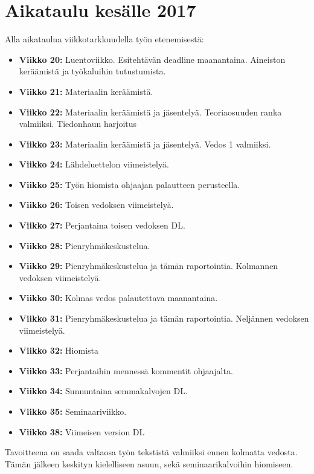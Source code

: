 \documentclass[finnish,12pt,a4paper,elec,utf8]{aaltothesis}
\begin{document}
\section{Aikataulu kesälle 2017}
Alla aikataulua viikkotarkkuudella työn etenemisestä:
\begin{itemize}
    \item \textbf{Viikko 20:} Luentoviikko. Esitehtävän deadline maanantaina. Aineiston keräämistä ja työkaluihin tutustumista.
    \item \textbf{Viikko 21:} Materiaalin keräämistä.
    \item \textbf{Viikko 22:} Materiaalin keräämistä ja jäsentelyä. Teoriaosuuden ranka valmiiksi. Tiedonhaun harjoitus
    \item \textbf{Viikko 23:} Materiaalin keräämistä ja jäsentelyä. Vedos 1 valmiiksi.
    \item \textbf{Viikko 24:} Lähdeluettelon viimeistelyä.
    \item \textbf{Viikko 25:} Työn hiomista ohjaajan palautteen perusteella.
    \item \textbf{Viikko 26:} Toisen vedoksen viimeistelyä.
    \item \textbf{Viikko 27:} Perjantaina toisen vedoksen DL.
    \item \textbf{Viikko 28:} Pienryhmäkeskustelua.
    \item \textbf{Viikko 29:} Pienryhmäkeskustelua ja tämän raportointia. Kolmannen vedoksen viimeistelyä.
    \item \textbf{Viikko 30:} Kolmas vedos palautettava maanantaina.
    \item \textbf{Viikko 31:} Pienryhmäkeskustelua ja tämän raportointia. Neljännen vedoksen viimeistelyä.
    \item \textbf{Viikko 32:} Hiomista
    \item \textbf{Viikko 33:} Perjantaihin mennessä kommentit ohjaajalta.
    \item \textbf{Viikko 34:} Sunnuntaina semmakalvojen DL.
    \item \textbf{Viikko 35:} Seminaariviikko.
    \item \textbf{Viikko 38:} Viimeisen version DL
\end{itemize}
Tavoitteena on saada valtaosa työn tekstistä valmiiksi ennen kolmatta vedosta.
Tämän jälkeen keskityn kielelliseen asuun, sekä seminaarikalvoihin hiomiseen.
\clearpage

\nocite{*}


\end{document}
